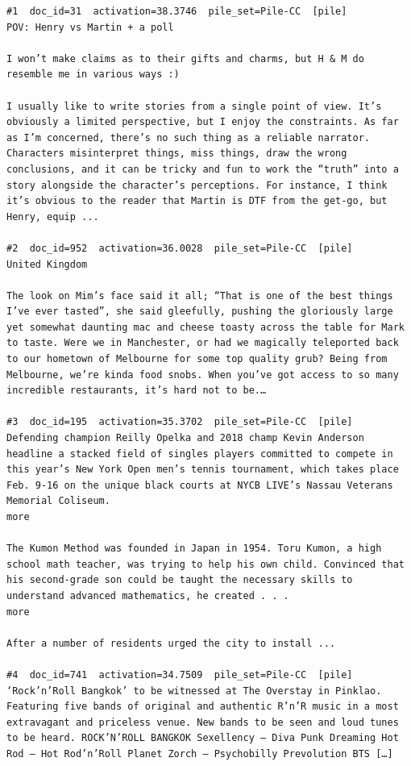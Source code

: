 \begin{verbatim}
#1  doc_id=31  activation=38.3746  pile_set=Pile-CC  [pile]
POV: Henry vs Martin + a poll

I won’t make claims as to their gifts and charms, but H & M do resemble me in various ways :)

I usually like to write stories from a single point of view. It’s obviously a limited perspective, but I enjoy the constraints. As far as I’m concerned, there’s no such thing as a reliable narrator. Characters misinterpret things, miss things, draw the wrong conclusions, and it can be tricky and fun to work the “truth” into a story alongside the character’s perceptions. For instance, I think it’s obvious to the reader that Martin is DTF from the get-go, but Henry, equip ...

#2  doc_id=952  activation=36.0028  pile_set=Pile-CC  [pile]
United Kingdom

The look on Mim’s face said it all; “That is one of the best things I’ve ever tasted”, she said gleefully, pushing the gloriously large yet somewhat daunting mac and cheese toasty across the table for Mark to taste. Were we in Manchester, or had we magically teleported back to our hometown of Melbourne for some top quality grub? Being from Melbourne, we’re kinda food snobs. When you’ve got access to so many incredible restaurants, it’s hard not to be.…

#3  doc_id=195  activation=35.3702  pile_set=Pile-CC  [pile]
Defending champion Reilly Opelka and 2018 champ Kevin Anderson headline a stacked field of singles players committed to compete in this year’s New York Open men’s tennis tournament, which takes place Feb. 9-16 on the unique black courts at NYCB LIVE’s Nassau Veterans Memorial Coliseum.
more

The Kumon Method was founded in Japan in 1954. Toru Kumon, a high school math teacher, was trying to help his own child. Convinced that his second-grade son could be taught the necessary skills to understand advanced mathematics, he created . . .
more

After a number of residents urged the city to install ...

#4  doc_id=741  activation=34.7509  pile_set=Pile-CC  [pile]
‘Rock’n’Roll Bangkok’ to be witnessed at The Overstay in Pinklao. Featuring five bands of original and authentic R’n’R music in a most extravagant and priceless venue. New bands to be seen and loud tunes to be heard. ROCK’N’ROLL BANGKOK Sexellency – Diva Punk Dreaming Hot Rod – Hot Rod’n’Roll Planet Zorch – Psychobilly Prevolution BTS […]


\end{verbatim}
